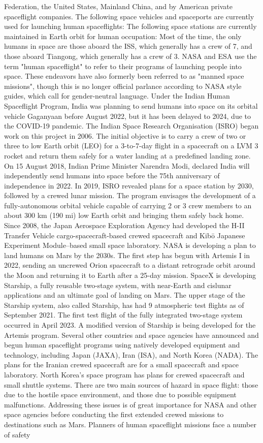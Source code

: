 \documentclass[12pt]{article}
\begin{document}
Federation, the United States, Mainland China, and by American private spaceflight companies. The following space vehicles and spaceports are currently used for launching human spaceflights: The following space stations are currently maintained in Earth orbit for human occupation: Most of the time, the only humans in space are those aboard the ISS, which generally has a crew of 7, and those aboard Tiangong, which generally has a crew of 3. NASA and ESA use the term "human spaceflight" to refer to their programs of launching people into space. These endeavors have also formerly been referred to as "manned space missions", though this is no longer official parlance according to NASA style guides, which call for gender-neutral language. Under the Indian Human Spaceflight Program, India was planning to send humans into space on its orbital vehicle Gaganyaan before August 2022, but it has been delayed to 2024, due to the COVID-19 pandemic. The Indian Space Research Organisation (ISRO) began work on this project in 2006. The initial objective is to carry a crew of two or three to low Earth orbit (LEO) for a 3-to-7-day flight in a spacecraft on a LVM 3 rocket and return them safely for a water landing at a predefined landing zone. On 15 August 2018, Indian Prime Minister Narendra Modi, declared India will independently send humans into space before the 75th anniversary of independence in 2022. In 2019, ISRO revealed plans for a space station by 2030, followed by a crewed lunar mission. The program envisages the development of a fully-autonomous orbital vehicle capable of carrying 2 or 3 crew members to an about 300 km (190 mi) low Earth orbit and bringing them safely back home. Since 2008, the Japan Aerospace Exploration Agency had developed the H-II Transfer Vehicle cargo-spacecraft-based crewed spacecraft and Kibō Japanese Experiment Module–based small space laboratory. NASA is developing a plan to land humans on Mars by the 2030s. The first step has begun with Artemis I in 2022, sending an uncrewed Orion spacecraft to a distant retrograde orbit around the Moon and returning it to Earth after a 25-day mission. SpaceX is developing Starship, a fully reusable two-stage system, with near-Earth and cislunar applications and an ultimate goal of landing on Mars. The upper stage of the Starship system, also called Starship, has had 9 atmospheric test flights as of September 2021. The first test flight of the fully integrated two-stage system occurred in April 2023. A modified version of Starship is being developed for the Artemis program. Several other countries and space agencies have announced and begun human spaceflight programs using natively developed equipment and technology, including Japan (JAXA), Iran (ISA), and North Korea (NADA). The plans for the Iranian crewed spacecraft are for a small spacecraft and space laboratory. North Korea's space program has plans for crewed spacecraft and small shuttle systems. There are two main sources of hazard in space flight: those due to the hostile space environment, and those due to possible equipment malfunctions. Addressing these issues is of great importance for NASA and other space agencies before conducting the first extended crewed missions to destinations such as Mars. Planners of human spaceflight missions face a number of safety 
\end{document}
